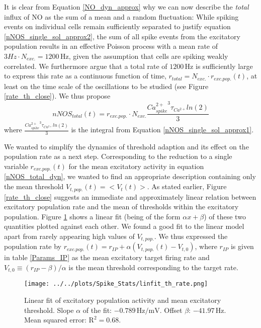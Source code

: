 \documentclass[10pt,a4paper]{article}
\begin{document}
It is clear from Equation \eqref{NO_dyn_approx} why we can now describe the \emph{total} influx of NO as the sum of a mean and a random fluctuation: While spiking events on individual cells remain sufficiently separated to justify equation \eqref{nNOS_single_sol_approx2}, the sum of all spike events from the excitatory population results in an effective Poisson process with a mean rate of $3 Hz \cdot N_{exc.} = \mathrm{1200\,Hz}$, given the assumption that cells are spiking weakly correlated. We furthermore argue that a total rate of $\mathrm{1200\,Hz}$ is sufficiently large to express this rate as a continuous function of time, $r_{total} = N_{exc.}\cdot r_{exc.pop.}(t)$, at least on the time scale of the oscillations to be studied (see  Figure \ref{rate_th_close}). We thus propose
\begin{equation}
nNOS_{total}(t) = r_{exc.pop.}\cdot N_{exc.}\frac{{Ca^{2+}_{spike}}^3 \tau_{Ca^{2+}}ln(2)}{3}
\label{nNOS_total_dyn}
\end{equation} 
where $\frac{{Ca^{2+}_{spike}}^3 \tau_{Ca^{2+}}ln(2)}{3}$ is the integral from Equation \eqref{nNOS_single_sol_approx1}.

We wanted to simplify the dynamics of threshold adaption and its effect on the population rate as a next step. Corresponding to the reduction to a single variable $r_{exc.pop.}(t)$ for the mean excitatory activity in equation \eqref{nNOS_total_dyn}, we wanted to find an appropriate description containing only the mean threshold $V_{t,pop.}(t) = <V_t(t)>$. As stated earlier, Figure \ref{rate_th_close} suggests an immediate and approximately linear relation between excitatory population rate and the mean of thresholds within the excitatory population. Figure \ref{thresh_r_linfit} shows a linear fit (being of the form $\alpha x + \beta$) of these two quantities plotted against each other. We found a good fit to the linear model apart from rarely appearing high values of $V_{t,pop.}$. We thus expressed the population rate by $r_{exc.pop.}(t) = r_{IP} + \alpha(V_{t,pop.}(t)-V_{t,0})$, where $r_{IP}$ is given in table \ref{Params_IP} as the mean excitatory target firing rate and $V_{t,0} \equiv (r_{IP}-\beta)/\alpha$ is the mean threshold corresponding to the target rate.
\begin{figure}
\texttt{[image: ../../plots/Spike\_Stats/linfit\_th\_rate.png]}
\caption{Linear fit of excitatory population activity and mean excitatory threshold. Slope $\alpha$ of the fit: $\mathrm{-0.789\, Hz/mV}$. Offset $\beta$: $\mathrm{-41.97\, Hz}$. Mean squared error: $\mathrm{R^2 = 0.68}$.}
\label{thresh_r_linfit}
\end{figure}
\end{document}
